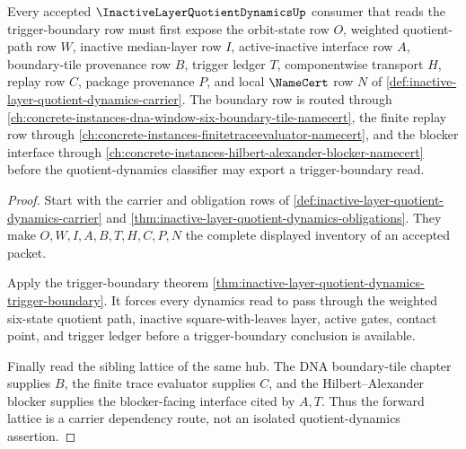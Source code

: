 \begin{theorem}
\label{thm:inactive-layer-quotient-dynamics-forward-lattice}
Every accepted $\InactiveLayerQuotientDynamicsUp$ consumer that reads the trigger-boundary row must first expose the orbit-state row $O$, weighted quotient-path row $W$, inactive median-layer row $I$, active-inactive interface row $A$, boundary-tile provenance row $B$, trigger ledger $T$, componentwise transport $H$, replay row $C$, package provenance $P$, and local $\NameCert$ row $N$ of \autoref{def:inactive-layer-quotient-dynamics-carrier}. The boundary row is routed through \autoref{ch:concrete-instances-dna-window-six-boundary-tile-namecert}, the finite replay row through \autoref{ch:concrete-instances-finitetraceevaluator-namecert}, and the blocker interface through \autoref{ch:concrete-instances-hilbert-alexander-blocker-namecert} before the quotient-dynamics classifier may export a trigger-boundary read.
\end{theorem}
\begin{proof}
Start with the carrier and obligation rows of \autoref{def:inactive-layer-quotient-dynamics-carrier} and \autoref{thm:inactive-layer-quotient-dynamics-obligations}. They make $O,W,I,A,B,T,H,C,P,N$ the complete displayed inventory of an accepted packet.

Apply the trigger-boundary theorem \autoref{thm:inactive-layer-quotient-dynamics-trigger-boundary}. It forces every dynamics read to pass through the weighted six-state quotient path, inactive square-with-leaves layer, active gates, contact point, and trigger ledger before a trigger-boundary conclusion is available.

Finally read the sibling lattice of the same hub. The DNA boundary-tile chapter supplies $B$, the finite trace evaluator supplies $C$, and the Hilbert--Alexander blocker supplies the blocker-facing interface cited by $A,T$. Thus the forward lattice is a carrier dependency route, not an isolated quotient-dynamics assertion.
\end{proof}
